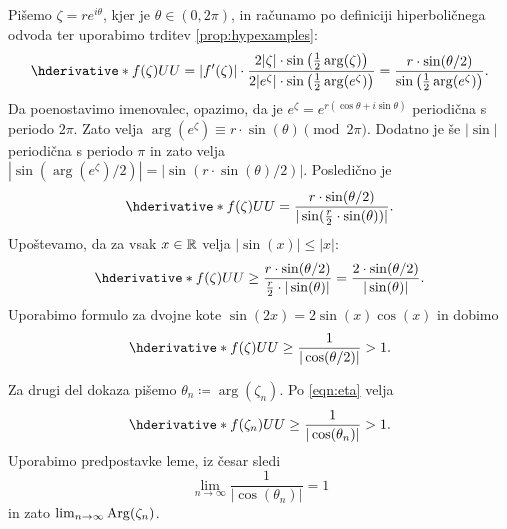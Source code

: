\begin{dokaz}
    Pišemo \(\zeta = r e^{i \theta}\), kjer je \(\theta \in (0, 2 \pi)\), in računamo po definiciji hiperboličnega odvoda ter uporabimo trditev \ref{prop:hypexamples}:
    \[
        \hder{f (\zeta)}{U}{U}
        =
        |f' (\zeta)| \cdot \frac{2 |\zeta| \cdot \sin \prt{\frac{1}{2} \arg (\zeta)}}{2 |e^{\zeta}| \cdot \sin \prt{\frac{1}{2} \arg (e^{\zeta})}}
        =
        \frac{r \cdot \sin (\theta / 2)}{\sin \prt{\frac{1}{2} \arg (e^{\zeta})}}.
    \]
    Da poenostavimo imenovalec, opazimo, da je \(e^{\zeta} = e^{r (\cos \theta + i \sin \theta)}\) periodična s periodo \(2 \pi\). Zato velja \(\arg (e^{\zeta}) \equiv r \cdot \sin (\theta) \pmod{2 \pi}\). Dodatno je še \(|\sin|\) periodična s periodo \(\pi\) in zato velja \(|\sin (\arg (e^{\zeta}) / 2)| = |\sin (r \cdot \sin (\theta) / 2)|\). Posledično je
    \[\hder{f (\zeta)}{U}{U} = \frac{r \cdot \sin (\theta / 2)}{|\sin (\frac{r}{2} \cdot \sin (\theta))|}.\]
    Upoštevamo, da za vsak \(x \in \mathbb R\) velja \(|\sin (x)| \leq |x|\):
    \[\hder{f (\zeta)}{U}{U} \geq \frac{r \cdot \sin (\theta / 2)}{\frac{r}{2} \cdot |\sin (\theta)|} = \frac{2 \cdot \sin (\theta / 2)}{|\sin (\theta)|}.\]
    Uporabimo formulo za dvojne kote \(\sin (2 x) = 2 \sin (x) \cos (x)\) in dobimo
    \begin{equation} \label{eqn:eta}
        \hder{f (\zeta)}{U}{U} \geq \frac{1}{|\cos (\theta / 2)|} > 1.
    \end{equation}

    \noindent Za drugi del dokaza pišemo \(\theta_n \coloneq \arg (\zeta_n)\). Po \eqref{eqn:eta} velja
    \[\hder{f (\zeta_n)}{U}{U} \geq \frac{1}{|\cos (\theta_n)|} > 1.\]
    Uporabimo predpostavke leme, iz česar sledi
    \[\lim_{n \to \infty} \frac{1}{|\cos (\theta_n)|} = 1\]
    in zato \(\lim_{n \to \infty} \operatorname{Arg} (\zeta_n)\).
\end{dokaz}



